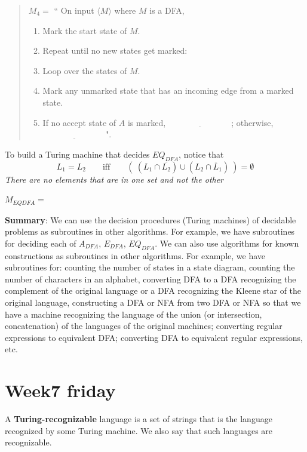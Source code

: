 \documentclass[12pt, oneside]{article}
\begin{document}
  
  \begin{quote}
  $M_4 =  $ `` On  input $\langle M \rangle$ where $M$ is  a  DFA,
  \begin{enumerate}
  \item Mark the start  state  of $M$.
  \item Repeat until no  new states get marked:
  \item \qquad Loop over the states of $M$. 
  \item \qquad Mark any unmarked  state  that  has an incoming  edge  from a marked state.
  \item If  no  accept state of $A$ is  marked, $\underline{\phantom{FILL  IN BLANK}}$;  otherwise, 
  $\underline{\phantom{FILL  IN BLANK}}$".
  \end{enumerate}
  \end{quote}
  
  
  
To build a Turing machine that decides $EQ_{DFA}$, notice that 
\[
L_1 = L_2 \qquad\textrm{iff}\qquad (~(L_1 \cap \overline{L_2}) \cup (L_2 \cap \overline L_1)~) = \emptyset  
\]
{\it There are no elements that are in one set and not the other}


$M_{EQDFA} = $ 


  \vfill
  
  \newpage
  {\bf Summary}:  We can use the decision procedures (Turing machines) of decidable problems
  as subroutines in other algorithms. For example, we have subroutines for deciding each of 
  $A_{DFA}$, $E_{DFA}$, $EQ_{DFA}$.  We can also use algorithms for known constructions
  as subroutines in other algorithms. For example, we have subroutines for: counting the number 
  of states in a state diagram, counting the number of characters in an alphabet, converting DFA
  to a DFA recognizing the complement of the original language or a DFA recognizing the 
  Kleene star of the original language, constructing a DFA or NFA from two DFA or NFA so that 
  we have a machine recognizing the language of the union (or intersection, concatenation)
  of the languages of the original machines; converting regular expressions to equivalent DFA; 
  converting DFA to equivalent regular expressions, etc.

 \vfill
\section*{Week7 friday}



A {\bf Turing-recognizable} language is a set of strings that 
is the language recognized by some Turing machine. We also 
say that such languages are recognizable.
\end{document}
